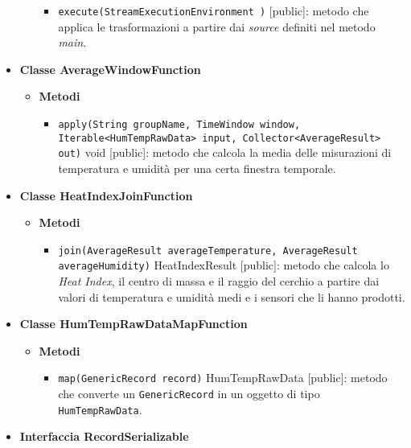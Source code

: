 \begin{itemize}
\begin{itemize}
\begin{itemize}
			            \item \texttt{execute(StreamExecutionEnvironment )} [public]: metodo che applica le trasformazioni a partire dai \textit{source} definiti nel metodo \textit{main}.
		            \end{itemize}
	      \end{itemize}
	\item \textbf{Classe AverageWindowFunction}
	      \begin{itemize}
		      \item \textbf{Metodi}
		            \begin{itemize}
			            \item \texttt{apply(String groupName, TimeWindow window, Iterable<HumTempRawData> input, Collector<AverageResult> out)} void [public]: metodo che calcola la media delle misurazioni di temperatura e umidità per una certa finestra temporale.
		            \end{itemize}
	      \end{itemize}
	\item \textbf{Classe HeatIndexJoinFunction}
	      \begin{itemize}
		      \item \textbf{Metodi}
		            \begin{itemize}
			            \item \texttt{join(AverageResult averageTemperature, AverageResult averageHumidity)} HeatIndexResult [public]: metodo che calcola lo \textit{Heat Index}, il centro di massa e il raggio del cerchio a partire dai valori di temperatura e umidità medi e i sensori che li hanno prodotti.
		            \end{itemize}
	      \end{itemize}
	\item \textbf{Classe HumTempRawDataMapFunction}
	      \begin{itemize}
		      \item \textbf{Metodi}
		            \begin{itemize}
			            \item \texttt{map(GenericRecord record)} HumTempRawData [public]: metodo che converte un \texttt{GenericRecord} in un oggetto di tipo \texttt{HumTempRawData}.
		            \end{itemize}
	      \end{itemize}
	\item \textbf{Interfaccia RecordSerializable}\label{record_serializable}
	      \begin{itemize}

\end{itemize}
\end{itemize}
